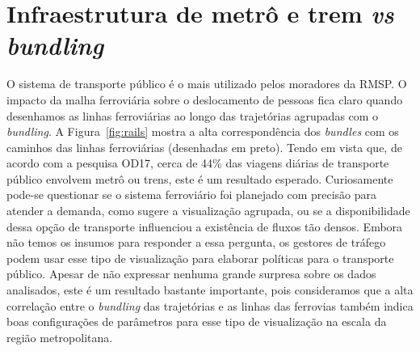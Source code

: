 
\section{Infraestrutura de metrô e trem \emph{vs} \emph{bundling}}
\label{sec:trail-overlap}

O sistema de transporte público é o mais utilizado pelos moradores da RMSP. O
impacto da malha ferroviária sobre o deslocamento de pessoas fica claro quando
desenhamos as linhas ferroviárias ao longo das trajetórias agrupadas com o
\emph{bundling}. A Figura~\ref{fig:rails} mostra a alta correspondência dos
\emph{bundles} com os caminhos das linhas ferroviárias (desenhadas em preto).
Tendo em vista que, de acordo com a pesquisa OD17, cerca de 44\% das viagens
diárias de transporte público envolvem metrô ou trens, este é um resultado
esperado. Curiosamente pode-se questionar se o sistema ferroviário foi planejado
com precisão para atender a demanda, como sugere a visualização agrupada, ou se
a disponibilidade dessa opção de transporte influenciou a existência de fluxos
tão densos. Embora não temos os insumos para responder a essa pergunta, os
gestores de tráfego podem usar esse tipo de visualização para elaborar políticas
para o transporte público. Apesar de não expressar nenhuma grande surpresa sobre os
dados analisados, este é um resultado bastante importante, pois consideramos que a alta
correlação entre o \emph{bundling} das trajetórias e as linhas das ferrovias
também indica boas configurações de parâmetros para esse tipo de visualização na
escala da região metropolitana.

